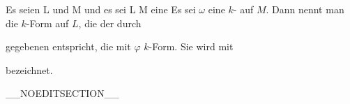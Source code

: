 {}
{

Es seien
\mathkor {} {L} {und} {M} {}
und es sei
\maabbdisp {\varphi} { L } { M
} {}
eine
Es sei $\omega$ eine $k$-
auf $M$. Dann nennt man die $k$-Form auf $L$, die der durch

 {  }

gegebenen
entspricht, die mit $\varphi$  $k$-Form.  Sie wird mit

\mathdisp {\varphi^* \omega} {  }

bezeichnet.

}

__NOEDITSECTION__


